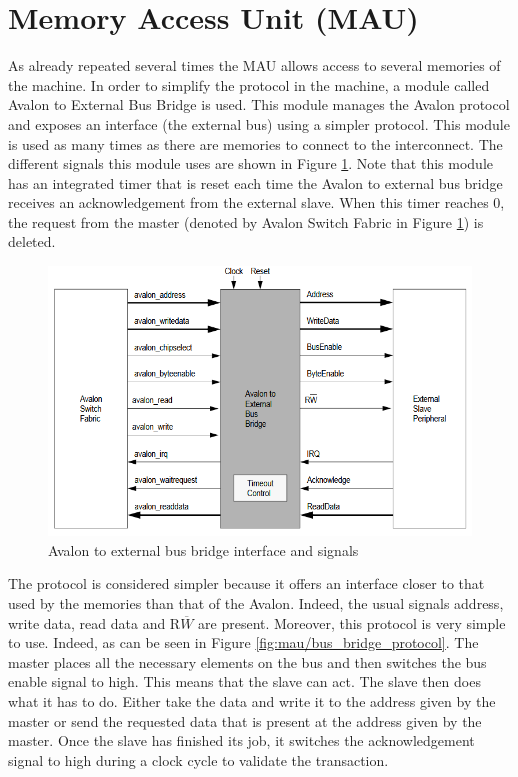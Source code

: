 \section{Memory Access Unit (MAU)}

As already repeated several times the MAU allows access to several memories of the machine. In order 
to simplify the protocol in the machine, a module called Avalon to External Bus Bridge is used. This 
module manages the Avalon protocol and exposes an interface (the external bus) using a simpler 
protocol. This module is used as many times as there are memories to connect to the interconnect.
The different signals this module uses are shown in Figure \ref{fig:mau/bus_bridge}. Note that this
module has an integrated timer that is reset each time the Avalon to external bus bridge receives
an acknowledgement from the external slave. When this timer reaches 0, the request from the master 
(denoted by Avalon Switch Fabric in Figure \ref{fig:mau/bus_bridge}) is deleted.

\begin{figure}[ht!]
    \center
    \includegraphics[scale=0.8]{"Chapter5-MAU_CTRLU/res/external_bus_bridge.PNG"}
    \caption{Avalon to external bus bridge interface and signals}
    \label{fig:mau/bus_bridge}
\end{figure}

The protocol is considered simpler because it offers an interface closer to that used by the memories 
than that of the Avalon. Indeed, the usual signals address, write data, read data and R$\overline{W}$ are 
present. Moreover, this protocol is very simple to use. Indeed, as can be seen in Figure \ref{fig:mau/bus_bridge_protocol}. The master 
places all the necessary elements on the bus and then switches the bus enable signal to high. This means 
that the slave can act. The slave then does what it has to do. Either take the data and write it to 
the address given by the master or send the requested data that is present at the address given by 
the master. Once the slave has finished its job, it switches the acknowledgement signal to high 
during a clock cycle to validate the transaction. 

